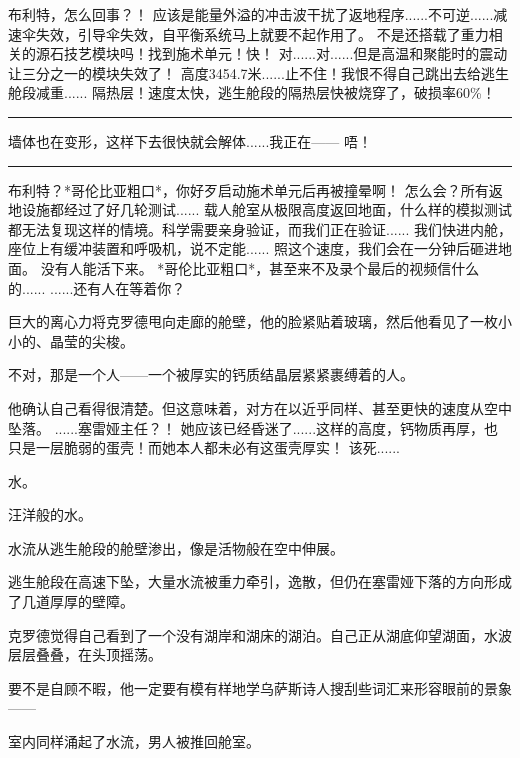 \documentclass[openany]{book}
\begin{document}
\begin{dialogue}
     布利特，怎么回事？！
     应该是能量外溢的冲击波干扰了返地程序......不可逆......减速伞失效，引导伞失效，自平衡系统马上就要不起作用了。
     不是还搭载了重力相关的源石技艺模块吗！找到施术单元！快！
     对......对......但是高温和聚能时的震动让三分之一的模块失效了！
     高度3454.7米......止不住！我恨不得自己跳出去给逃生舱段减重......
     隔热层！速度太快，逃生舱段的隔热层快被烧穿了，破损率60\%！
    \par\noindent\rule{\textwidth}{0.4pt}
     墙体也在变形，这样下去很快就会解体......我正在——
     唔！
    \par\noindent\rule{\textwidth}{0.4pt}
     布利特？*哥伦比亚粗口*，你好歹启动施术单元后再被撞晕啊！
     怎么会？所有返地设施都经过了好几轮测试......
     载人舱室从极限高度返回地面，什么样的模拟测试都无法复现这样的情境。科学需要亲身验证，而我们正在验证......
     我们快进内舱，座位上有缓冲装置和呼吸机，说不定能......
     照这个速度，我们会在一分钟后砸进地面。
     没有人能活下来。
     *哥伦比亚粗口*，甚至来不及录个最后的视频信什么的......
     ......还有人在等着你？\par
    巨大的离心力将克罗德甩向走廊的舱壁，他的脸紧贴着玻璃，然后他看见了一枚小小的、晶莹的尖梭。\par
    不对，那是一个人——一个被厚实的钙质结晶层紧紧裹缚着的人。\par
    他确认自己看得很清楚。但这意味着，对方在以近乎同样、甚至更快的速度从空中坠落。
     ......塞雷娅主任？！
     她应该已经昏迷了......这样的高度，钙物质再厚，也只是一层脆弱的蛋壳！而她本人都未必有这蛋壳厚实！
     该死......
\end{dialogue}\par

水。\par
汪洋般的水。\par
水流从逃生舱段的舱壁渗出，像是活物般在空中伸展。\par
逃生舱段在高速下坠，大量水流被重力牵引，逸散，但仍在塞雷娅下落的方向形成了几道厚厚的壁障。\par
克罗德觉得自己看到了一个没有湖岸和湖床的湖泊。自己正从湖底仰望湖面，水波层层叠叠，在头顶摇荡。\par
要不是自顾不暇，他一定要有模有样地学乌萨斯诗人搜刮些词汇来形容眼前的景象——\par
室内同样涌起了水流，男人被推回舱室。
\end{document}
